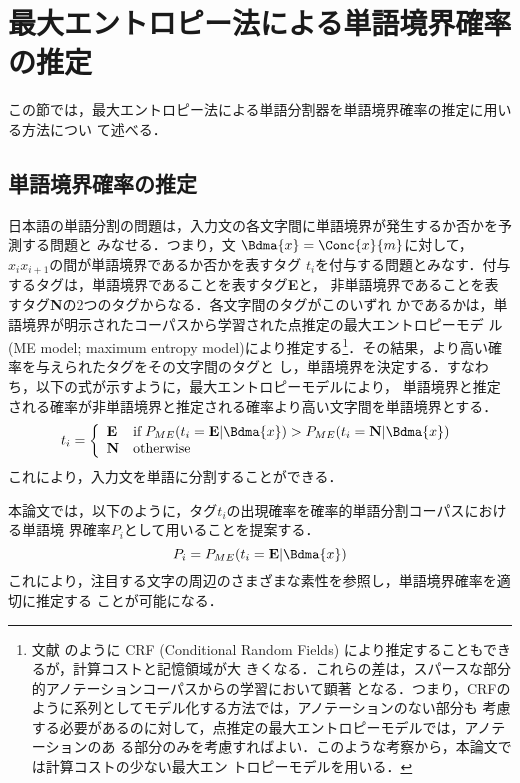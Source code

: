 \documentclass[japanese]{jnlp_1.4}
\begin{document}
\section{最大エントロピー法による単語境界確率の推定}

この節では，最大エントロピー法による単語分割器を単語境界確率の推定に用いる方法につい
て述べる．



\subsection{単語境界確率の推定}

\label{subsection:ME}

日本語の単語分割の問題は，入力文の各文字間に単語境界が発生するか否かを予測する問題と
みなせる\cite{教師なし隠れマルコフモデルを利用した最大エントロピータグ付けモデル,Training.Conditional.Random.Fields.Using.Incomplete.Annotations}．つまり，文
$\Bdma{x} = \Conc{x}{m}$に対して，$x_{i}x_{i+1}$の間が単語境界であるか否かを表すタグ
$t_{i}$を付与する問題とみなす．付与するタグは，単語境界であることを表すタグ{\bf E}と，
非単語境界であることを表すタグ{\bf N}の2つのタグからなる．各文字間のタグがこのいずれ
かであるかは，単語境界が明示されたコーパスから学習された点推定の最大エントロピーモデ
ル(ME model; maximum entropy model)により推定する\footnote{文献
\cite{Training.Conditional.Random.Fields.Using.Incomplete.Annotations}のように
CRF (Conditional Random Fields) により推定することもできるが，計算コストと記憶領域が大
きくなる．これらの差は，スパースな部分的アノテーションコーパスからの学習において顕著
となる．つまり，CRFのように系列としてモデル化する方法では，アノテーションのない部分も
考慮する必要があるのに対して，点推定の最大エントロピーモデルでは，アノテーションのあ
る部分のみを考慮すればよい．このような考察から，本論文では計算コストの少ない最大エン
トロピーモデルを用いる．}．その結果，より高い確率を与えられたタグをその文字間のタグと
し，単語境界を決定する．すなわち，以下の式が示すように，最大エントロピーモデルにより，
単語境界と推定される確率が非単語境界と推定される確率より高い文字間を単語境界とする．
\[
  t_{i} = \left\{
    \begin{array}{ll}
      \mbox{\bf E}
      & \mbox{if} \; P_{ME}(t_{i}={\bf E}|\Bdma{x}) > P_{ME}(t_{i}={\bf N}|\Bdma{x})\\
      \mbox{\bf N}
      & \mbox{otherwise}
    \end{array}\right.
\]
これにより，入力文を単語に分割することができる．

本論文では，以下のように，タグ$t_{i}$の出現確率を確率的単語分割コーパスにおける単語境
界確率$P_{i}$として用いることを提案する．
\begin{displaymath}
  P_{i} = P_{ME}(t_{i}={\bf E}|\Bdma{x})
\end{displaymath}
これにより，注目する文字の周辺のさまざまな素性を参照し，単語境界確率を適切に推定する
ことが可能になる．
\end{document}
